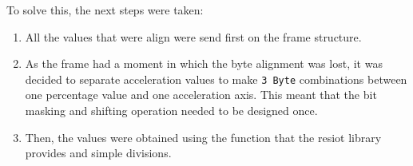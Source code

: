 To solve this, the next steps were taken:
\begin{enumerate}
    \item All the values that were align were send first on the frame structure.
    \item As the frame had a moment in which the byte alignment was lost, it was decided to separate acceleration values to make \texttt{3 Byte} combinations between one percentage 
    value and one acceleration axis. This meant that the bit masking and shifting operation needed to be designed once.
    \item Then, the values were obtained using the function that the resiot library provides and simple divisions.
\end{enumerate}
